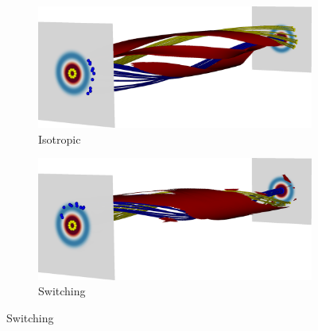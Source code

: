 \begin{figure}[t]
  \centering
  \begin{subfigure}[b]{0.48\textwidth}
    \includegraphics[width=\linewidth]{field_line_plots/cropped/v1e-4r5e-4.5-isotropic_0035_cropped.png}
    \caption{Isotropic}
    \label{fig:reconnection-field-lines-iso}
  \end{subfigure}
  \begin{subfigure}[b]{0.48\textwidth}
    \includegraphics[width=\linewidth]{field_line_plots/cropped/v1e-4r5e-4.5-switching_0035_cropped.png}
    \caption{Switching}
    \label{fig:reconnection-field-lines-swi}
  \end{subfigure}
\label{fig:reconnection-field-lines}
\end{figure}


